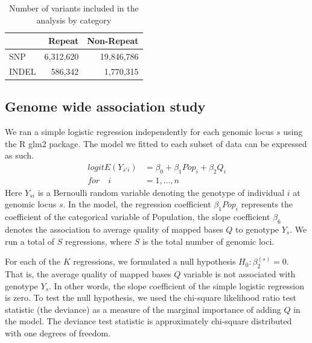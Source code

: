\documentclass[9pt,lineno]{elife}
\begin{document}
\begin{table}[h]
\begin{tabular}{l  r r}
                      & {Repeat}  & {Non-Repeat}       \\ \hline
{SNP}  & 6,312,620 & 19,846,786   \\  
{INDEL} &  586,342  & 1,770,315 \\ \hline
\end{tabular}
\caption{Number of variants included in the analysis by category}
\label{totTable}
\end{table}

\subsection{Genome wide association study}
We ran a simple logistic regression independently for each genomic locus $s$ using the R glm2 package\citep{RDevelopmentCoreTeam2016}. The model we fitted to each subset of data can be expressed as such.
\begin{align*}
{logit}{E(Y_{s'i})} &= \beta_{0}  + \beta_{1}{Pop}_{i}  + \beta_{2}Q_{i}
\\
\textit{for}\quad i &= 1,\hdots, n
\end{align*}
Here $Y_{si}$ is a Bernoulli random variable denoting the genotype of individual $i$ at genomic locus $s$. 
In the model, the regression coefficient $\beta_{1}{Pop}_{i}$ represents the coefficient of the categorical variable of Population, the slope coefficient $\beta_{6}$ denotes the association to average quality of mapped bases $Q$ to genotype $Y_{s}$. 
We run a total of $S$ regressions, where $S$ is the total number of genomic loci. 

For each of the $K$ regressions, we formulated a null hypothesis $H_{0}: \beta_{2}^{(s)}=0$. That is, the average quality of mapped bases $Q$ variable is not associated with genotype $Y_{s}$.
In other words, the slope coefficient of the simple logistic regression is zero.
To test the null hypothesis, we used the chi-square likelihood ratio test statistic (the deviance) as a measure of the marginal importance of adding $Q$ in the model. 
The deviance test statistic is approximately chi-square distributed with one degrees of freedom.
\end{document}

